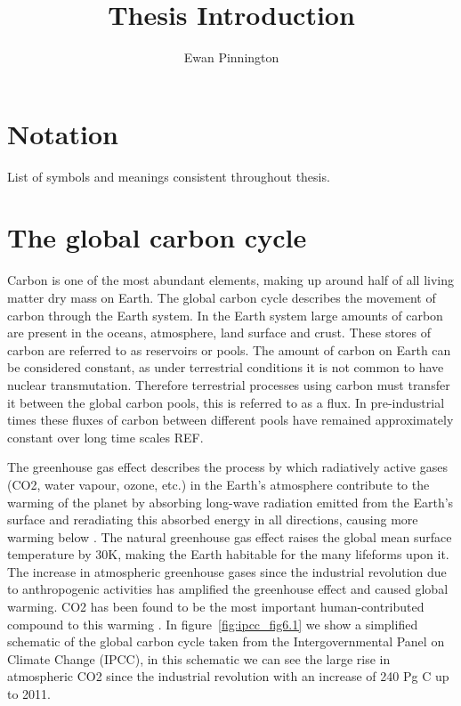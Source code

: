 \documentclass[11pt]{article}
\title{Thesis Introduction}
\author{Ewan Pinnington}
\begin{document}
\maketitle

\section{Notation}
List of symbols and meanings consistent throughout thesis.

\section{The global carbon cycle}

Carbon is one of the most abundant elements, making up around half of all living matter dry mass on Earth. The global carbon cycle describes the movement of carbon through the Earth system. In the Earth system large amounts of carbon are present in the oceans, atmosphere, land surface and crust. These stores of carbon are referred to as reservoirs or pools. The amount of carbon on Earth can be considered constant, as under terrestrial conditions it is not common to have nuclear transmutation. Therefore terrestrial processes using carbon must transfer it between the global carbon pools, this is referred to as a flux. In pre-industrial times these fluxes of carbon between different pools have remained approximately constant over long time scales REF.

The greenhouse gas effect describes the process by which radiatively active gases (CO2, water vapour, ozone, etc.) in the Earth's atmosphere contribute to the warming of the planet by absorbing long-wave radiation emitted from the Earth's surface and reradiating this absorbed energy in all directions, causing more warming below \citep{mitchell1989greenhouse}. The natural greenhouse gas effect raises the global mean surface temperature by 30K, making the Earth habitable for the many lifeforms upon it. The increase in atmospheric greenhouse gases since the industrial revolution due to anthropogenic activities has amplified the greenhouse effect and caused global warming. CO2 has been found to be the most important human-contributed compound to this warming \citep{Falkowski291}. In figure~\ref{fig:ipcc_fig6.1} we show a simplified schematic of the global carbon cycle taken from the Intergovernmental Panel on Climate Change (IPCC), in this schematic we can see the large rise in atmospheric CO2 since the industrial revolution with an increase of 240 Pg C up to 2011.
\end{document}

